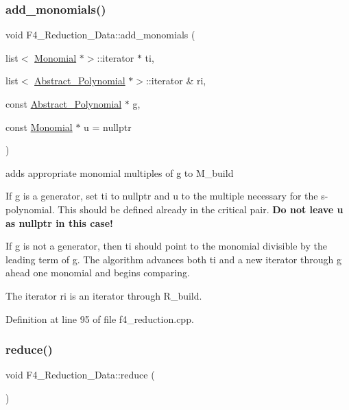 \subsubsection{\texorpdfstring{add\+\_\+monomials()}{add\_monomials()}}
{\footnotesize\ttfamily void F4\+\_\+\+Reduction\+\_\+\+Data\+::add\+\_\+monomials (\begin{DoxyParamCaption}\item[{list$<$ \hyperlink{class_monomial}{Monomial} $\ast$$>$\+::iterator $\ast$}]{ti,  }\item[{list$<$ \hyperlink{class_abstract___polynomial}{Abstract\+\_\+\+Polynomial} $\ast$$>$\+::iterator \&}]{ri,  }\item[{const \hyperlink{class_abstract___polynomial}{Abstract\+\_\+\+Polynomial} $\ast$}]{g,  }\item[{const \hyperlink{class_monomial}{Monomial} $\ast$}]{u = {\ttfamily nullptr} }\end{DoxyParamCaption})}



adds appropriate monomial multiples of {\ttfamily g} to {\ttfamily M\+\_\+build} 

If {\ttfamily g} is a generator, set {\ttfamily ti} to {\ttfamily nullptr} and {\ttfamily u} to the multiple necessary for the s-\/polynomial. This should be defined already in the critical pair. {\bfseries Do not leave {\ttfamily u} as {\ttfamily nullptr} in this case!}

If {\ttfamily g} is not a generator, then {\ttfamily ti} should point to the monomial divisible by the leading term of {\ttfamily g}. The algorithm advances both {\ttfamily ti} and a new iterator through {\ttfamily g} ahead one monomial and begins comparing.

The iterator {\ttfamily ri} is an iterator through {\ttfamily R\+\_\+build}. 

Definition at line 95 of file f4\+\_\+reduction.\+cpp.

\mbox{\label{class_f4___reduction___data_a511ad15c3953fa8e137c726cd62afbf3}} 
\subsubsection{\texorpdfstring{reduce()}{reduce()}}
{\footnotesize\ttfamily void F4\+\_\+\+Reduction\+\_\+\+Data\+::reduce (\begin{DoxyParamCaption}{ }\end{DoxyParamCaption})}



